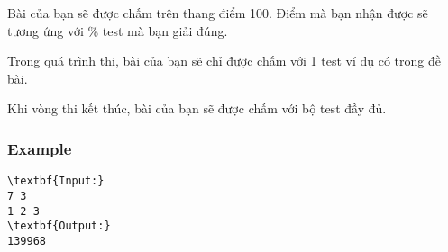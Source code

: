 Bài của bạn sẽ được chấm trên thang điểm 100. Điểm mà bạn nhận được sẽ tương ứng với \% test mà bạn giải đúng.

Trong quá trình thi, bài của bạn sẽ chỉ được chấm với 1 test ví dụ có trong đề bài.

Khi vòng thi kết thúc, bài của bạn sẽ được chấm với bộ test đầy đủ.

\subsubsection{Example}
\begin{verbatim}
\textbf{Input:}
7 3
1 2 3
\textbf{Output:}
139968\end{verbatim}
